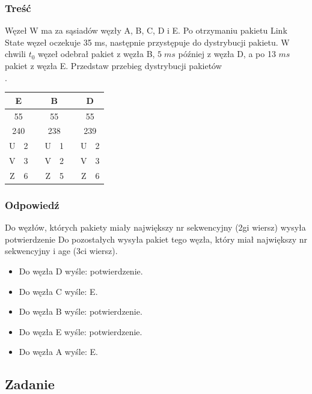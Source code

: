 		\subsubsection{Treść}
			Węzeł W ma za sąsiadów węzły A, B, C, D i E. Po otrzymaniu pakietu Link State węzeł oczekuje 35 ms, następnie przystępuje do dystrybucji pakietu. W chwili $ t_0 $ węzeł odebrał pakiet z węzła B, $ 5\;ms $ później z węzła D, a po 13 $ ms $ pakiet z węzła E. Przedstaw przebieg dystrybucji pakietów\\.
			\begin{tabular}{|c|c|c|c|c|c|c|c|}
				\hline \multicolumn{2}{|c|}{\textbf{E}}  & & \multicolumn{2}{|c|}{\textbf{B}} & & \multicolumn{2}{|c|}{\textbf{D}}\\ 
				\hline \multicolumn{2}{|c|}{55} & &\multicolumn{2}{|c|}{55} & &\multicolumn{2}{|c|}{55} \\ 
				\hline \multicolumn{2}{|c|}{240} & &\multicolumn{2}{|c|}{238} & &\multicolumn{2}{|c|}{239}   \\ 
				\hline U & 2 & & U & 1 & & U & 2\\ 
				\hline V & 3 & & V & 2 & & V & 3\\
				\hline Z & 6 & & Z & 5 & & Z & 6\\
				\hline 
			\end{tabular}
		\subsubsection{Odpowiedź}
			Do węzłów, których pakiety miały największy nr sekwencyjny (2gi wiersz) wysyła potwierdzenie
			Do pozostałych wysyła pakiet tego węzła, który miał największy nr sekwencyjny i age (3ci wiersz).
			\begin{itemize}
				\item Do węzła D wyśle: potwierdzenie.
				\item Do węzła C wyśle: E.
				\item Do węzła B wyśle: potwierdzenie.
				\item Do węzła E wyśle: potwierdzenie.
				\item Do węzła A wyśle: E.
			\end{itemize}
	\subsection{Zadanie}
